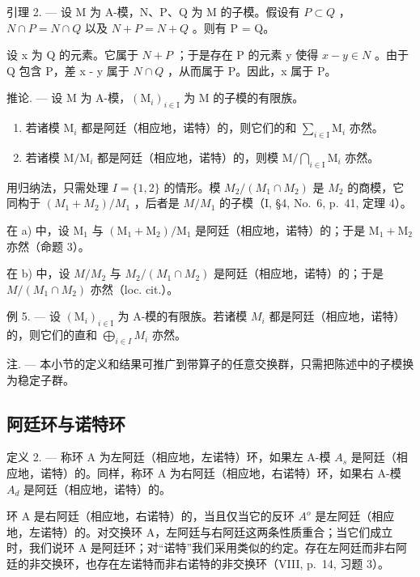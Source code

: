 引理 2. --- 设 M 为 A-模，N、P、Q 为 M 的子模。假设有 \(P \subset Q\) ，\(N \cap P = N \cap Q\) 以及 \(N + P = N + Q\) 。则有 P = Q。

设 x 为 Q 的元素。它属于 \(N + P\) ；于是存在 P 的元素 y 使得 \(x - y \in N\) 。由于 Q 包含 P，差 x - y 属于 \(N \cap Q\) ，从而属于 P。因此，x 属于 P。

推论. --- 设 M 为 A-模，\((\mathrm{M}_{i})_{i\in\mathrm{I}}\) 为 M 的子模的有限族。

\begin{enumerate}
\def\labelenumi{\alph{enumi})}
\item
  若诸模 \(\mathrm{M}_i\) 都是阿廷（相应地，诺特）的，则它们的和 \(\sum_{i\in \mathrm{I}}\mathrm{M}_i\) 亦然。
\item
  若诸模 \(\mathrm{M} / \mathrm{M}_i\) 都是阿廷（相应地，诺特）的，则模 \(\mathrm{M} / \bigcap_{i\in \mathrm{I}}\mathrm{M}_i\) 亦然。
\end{enumerate}

用归纳法，只需处理 \(I = \{1, 2\}\) 的情形。模 \(M_{2}/(M_{1} \cap M_{2})\) 是 \(M_{2}\) 的商模，它同构于 \((M_{1} + M_{2})/M_{1}\) ，后者是 \(M/M_{1}\) 的子模（I, §4, No.~6, p.~41, 定理 4）。

在 a) 中，设 \(\mathrm{M}_1\) 与 \((\mathrm{M}_1 + \mathrm{M}_2) / \mathrm{M}_1\) 是阿廷（相应地，诺特）的；于是 \(\mathrm{M}_1 + \mathrm{M}_2\) 亦然（命题 3）。

在 b) 中，设 \(M/M_{2}\) 与 \(M_{2}/(M_{1} \cap M_{2})\) 是阿廷（相应地，诺特）的；于是 \(M/(M_{1} \cap M_{2})\) 亦然（loc. cit.）。

例 5. --- 设 \((\mathrm{M}_{i})_{i\in\mathrm{I}}\) 为 A-模的有限族。若诸模 \(M_{i}\) 都是阿廷（相应地，诺特）的，则它们的直和 \(\bigoplus_{i\in I} M_{i}\) 亦然。

注. --- 本小节的定义和结果可推广到带算子的任意交换群，只需把陈述中的子模换为稳定子群。

\subsection{阿廷环与诺特环}

定义 2. --- 称环 A 为左阿廷（相应地，左诺特）环，如果左 A-模 \(A_{s}\) 是阿廷（相应地，诺特）的。同样，称环 A 为右阿廷（相应地，右诺特）环，如果右 A-模 \(A_{d}\) 是阿廷（相应地，诺特）的。

环 A 是右阿廷（相应地，右诺特）的，当且仅当它的反环 \(A^{o}\) 是左阿廷（相应地，左诺特）的。对交换环 A，左阿廷与右阿廷这两条性质重合；当它们成立时，我们说环 A 是阿廷环；对``诺特''我们采用类似的约定。存在左阿廷而非右阿廷的非交换环，也存在左诺特而非右诺特的非交换环（VIII, p.~14, 习题 3）。

